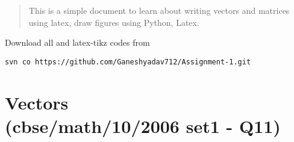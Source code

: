 \documentclass[journal,12pt,twocolumn]{IEEEtran}
\begin{document}
\newpage
\bigskip
\renewcommand{\thefigure}{\theenumi}
\renewcommand{\thetable}{\theenumi}
\begin{abstract}
This is a simple document to learn about writing vectors and matrices using latex, draw figures using Python, Latex.
\end{abstract}
%
Download all and latex-tikz codes from 
%
\begin{lstlisting}
svn co https://github.com/Ganeshyadav712/Assignment-1.git
\end{lstlisting}
%
\section{Vectors\\(cbse/math/10/2006 set1 - Q11)}
\renewcommand{\theequation}{\theenumi}
\end{document}

